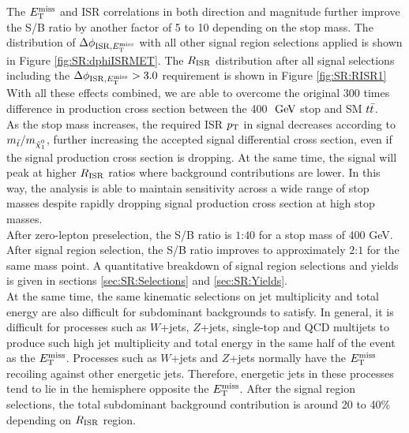 \indent The $E_{\mathrm{T}}^{\mathrm{miss}}$ and ISR correlations in both direction and magnitude further improve the S/B ratio by another factor of 5 to 10 depending on the stop mass.  The distribution of $\Delta\phi_{\mathrm{ISR},E_{\mathrm{T}}^{\mathrm{miss}}}$ with all other signal region selections applied is shown in Figure \ref{fig:SR:dphiISRMET}. The $R_{\mathrm{ISR}}$ distribution after all signal selections including the $\Delta\phi_{\mathrm{ISR},E_{\mathrm{T}}^{\mathrm{miss}}} > 3.0 $ requirement is shown in Figure \ref{fig:SR:RISR1} \\

\indent With all these effects combined, we are able to overcome the original 300 times difference in production cross section between the 400 $\gev$ stop and SM $t\bar{t}$.  \\

\indent As the stop mass increases, the required ISR $p_{\mathrm{T}}$ in signal decreases according to $m_{\stop}/m_{\ninoone}$, further increasing the accepted signal differential cross section, even if the signal production cross section is dropping.  At the same time, the signal will peak at higher $R_{\mathrm{ISR}}$ ratios where background contributions are lower.  In this way, the analysis is able to maintain sensitivity across a wide range of stop masses despite rapidly dropping signal production cross section at high stop masses.  \\

\indent After zero-lepton preselection, the S/B ratio is $1$:$40$ for a stop mass of 400 GeV.  After signal region selection, the S/B ratio improves to approximately $2$:$1$ for the same mass point.  A quantitative breakdown of signal region selections and yields is given in sections \ref{sec:SR:Selections} and \ref{sec:SR:Yields}.  \\

\indent At the same time, the same kinematic selections on jet multiplicity and total energy are also difficult for subdominant backgrounds to satisfy.  In general, it is difficult for processes such as $W$+jets, $Z$+jets, single-top and QCD multijets to produce such high jet multiplicity and total energy in the same half of the event as the $E_{\mathrm{T}}^{\mathrm{miss}}$.   Processes such as $W$+jets and $Z$+jets normally have the $E_{\mathrm{T}}^{\mathrm{miss}}$ recoiling against other energetic jets.  Therefore, energetic jets in these processes tend to lie in the hemisphere opposite the $E_{\mathrm{T}}^{\mathrm{miss}}$.  After the signal region selections, the total subdominant background contribution is around 20 to 40\% depending on $R_{\mathrm{ISR}}$ region.  \\




